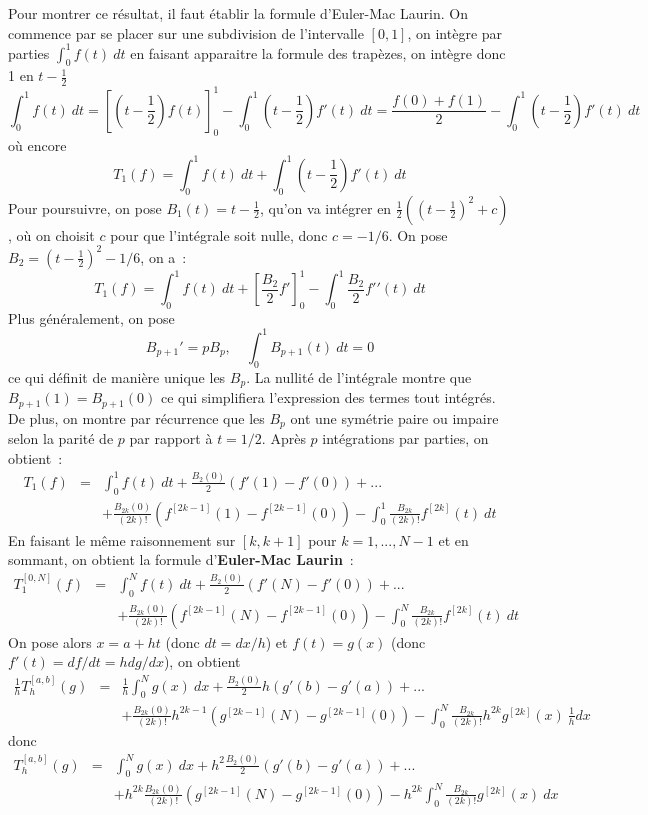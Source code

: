 \documentclass[a4paper,11pt]{book}
\begin{document}
\begin{giacjshere}
Pour montrer ce résultat, il faut établir la formule d'Euler-Mac
Laurin. On commence par se placer sur une subdivision de l'intervalle
$[0,1]$, on intègre par parties $\int_0^1 f(t)\ dt$ en faisant apparaitre
la formule des trapèzes, on intègre donc 1 en $t-\frac{1}{2}$
$$ \int_0^1 f(t) \ dt = 
[(t-\frac{1}{2})f(t)]_0^1 - \int_0^1 (t-\frac{1}{2})f'(t) \ dt =
\frac{f(0)+f(1)}{2} - \int_0^1 (t-\frac{1}{2})f'(t) \ dt
$$
où encore
$$ T_1(f)=\int_0^1 f(t) \ dt 
+  \int_0^1 (t-\frac{1}{2})f'(t) \ dt $$
Pour poursuivre, on pose $B_1(t)=t-\frac{1}{2}$, qu'on va intégrer
en $\frac{1}{2}((t-\frac{1}{2})^2+c)$, où on choisit $c$ pour que l'intégrale
soit nulle, donc $c=-1/6$. On pose $B_2=(t-\frac{1}{2})^2-1/6$, on a~:
$$  T_1(f)=\int_0^1 f(t) \ dt 
+ [\frac{B_2}{2} f']_0^1 - \int_0^1 \frac{B_2}{2}f'{'}(t) \ dt 
$$
Plus
généralement, on pose
$$ B_{p+1}'=pB_p, \quad \int_0^1 B_{p+1}(t) \ dt=0 $$
ce qui définit de manière unique les $B_p$. La nullité de l'intégrale
montre que $B_{p+1}(1)=B_{p+1}(0)$ ce qui simplifiera l'expression des
termes tout intégrés. De plus, on montre par récurrence
que les $B_p$ ont une symétrie paire
ou impaire selon la parité de $p$ par rapport à $t=1/2$.
Après $p$ intégrations par parties, on obtient~:
\begin{eqnarray*}
  T_1(f)&=&\int_0^1 f(t) \ dt 
+ \frac{B_2(0)}{2} (f'(1)-f'(0)) 
+ ... \\
& &+ \frac{B_{2k}(0)}{(2k)!} (f^{[2k-1]}(1)-f^{[2k-1]}(0)) 
- \int_0^1 \frac{B_{2k}}{(2k)!} f^{[2k]}(t) \ dt 
\end{eqnarray*}
En faisant le même raisonnement sur $[k,k+1]$ pour $k=1,...,N-1$
et en sommant, on obtient la formule 
d'{\bf Euler-Mac Laurin}~:
\begin{eqnarray*}
  T_1^{[0,N]}(f)&=&\int_0^N f(t) \ dt 
+ \frac{B_2(0)}{2} (f'(N)-f'(0)) 
+ ... \\
& & + \frac{B_{2k}(0)}{(2k)!} (f^{[2k-1]}(N)-f^{[2k-1]}(0)) 
- \int_0^N \frac{B_{2k}}{(2k)!} f^{[2k]}(t) \ dt 
\end{eqnarray*}
On pose alors $x=a+ht$ (donc $dt=dx/h$) et $f(t)=g(x)$
(donc $f'(t)=df/dt=h dg/dx$), on obtient 
\begin{eqnarray*}
 \frac1h T_h^{[a,b]}(g)&=& \frac1h \int_0^N g(x) \ dx 
+ \frac{B_2(0)}{2} h(g'(b)-g'(a)) 
+ ... \\
& &+ \frac{B_{2k}(0)}{(2k)!} h^{2k-1} (g^{[2k-1]}(N)-g^{[2k-1]}(0)) 
- \int_0^N \frac{B_{2k}}{(2k)!} h^{2k} g^{[2k]}(x) \ \frac1h dx 
\end{eqnarray*}
donc
\begin{eqnarray*}
 T_h^{[a,b]}(g) &=&  \int_0^N g(x) \ dx 
+ h^2 \frac{B_2(0)}{2} (g'(b)-g'(a)) 
+ ... \\
& & + h^{2k} \frac{B_{2k}(0)}{(2k)!}  (g^{[2k-1]}(N)-g^{[2k-1]}(0)) 
- h^{2k} \int_0^N \frac{B_{2k}}{(2k)!}  g^{[2k]}(x) \  dx 
\end{eqnarray*}


\end{giacjshere}
\end{document}

